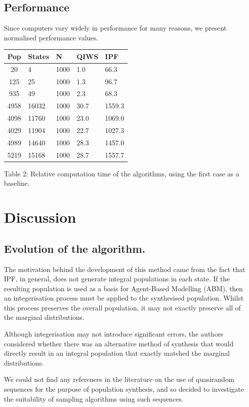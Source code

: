 \documentclass[]{article}
\begin{document}
\subsection{Performance}\label{performance}

Since computers vary widely in performance for many reasons, we present
normalised performance values.

\begin{longtable}[]{@{}cllll@{}}
\toprule
Pop & States & N & QIWS & IPF\tabularnewline
\midrule
\endhead
20 & 4 & 1000 & 1.0 & 66.3\tabularnewline
125 & 25 & 1000 & 1.3 & 96.7\tabularnewline
935 & 49 & 1000 & 2.3 & 68.3\tabularnewline
4958 & 16032 & 1000 & 30.7 & 1559.3\tabularnewline
4098 & 11760 & 1000 & 23.0 & 1069.0\tabularnewline
4029 & 11904 & 1000 & 22.7 & 1027.3\tabularnewline
4989 & 14640 & 1000 & 28.3 & 1457.0\tabularnewline
5219 & 15168 & 1000 & 28.7 & 1557.7\tabularnewline
\bottomrule
\end{longtable}

\begin{center}
Table 2: Relative computation time of the algorithms, using the first
case as a baseline.
\end{center}

\section{Discussion}\label{discussion}

\subsection{Evolution of the
algorithm.}\label{evolution-of-the-algorithm.}

The motivation behind the development of this method came from the fact
that IPF, in general, does not generate integral populations in each
state. If the resulting population is used as a basis for Agent-Based
Modelling (ABM), then an integerisation process must be applied to the
synthesised population. Whilst this process preserves the overall
population, it may not exactly preserve all of the marginal
distributions.

Although integerisation may not introduce significant errors, the
authors considered whether there was an alternative method of synthesis
that would directly result in an integral population that exactly
matched the marginal distributions.

We could not find any references in the literature on the use of
quasirandom sequences for the purpose of population synthesis, and so
decided to investigate the suitability of sampling algorithms using such
sequences.
\end{document}
